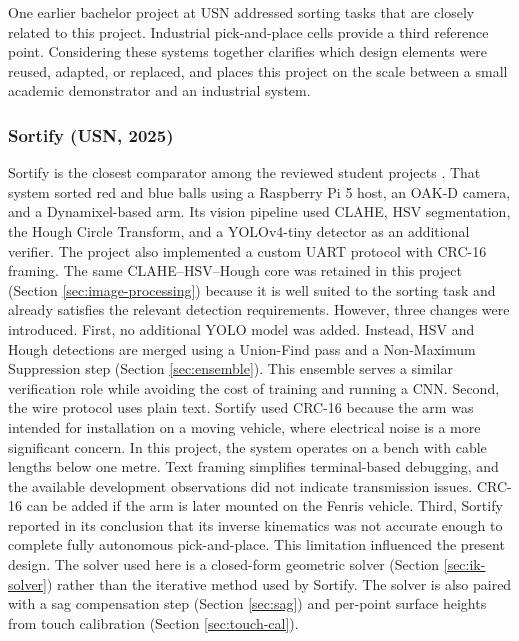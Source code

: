 \label{sec:related-systems}
One earlier bachelor project at USN addressed sorting tasks that are
closely related to this project. Industrial pick-and-place cells provide
a third reference point. Considering these systems together clarifies
which design elements were reused, adapted, or replaced, and places this
project on the scale between a small academic demonstrator and an
industrial system.

\subsubsection*{Sortify (USN, 2025)}
Sortify is the closest comparator among the reviewed student projects
\cite{sortify}. That system sorted red and blue balls using a Raspberry
Pi 5 host, an OAK-D camera, and a Dynamixel-based arm. Its vision
pipeline used CLAHE, HSV segmentation, the Hough Circle Transform, and a
YOLOv4-tiny detector as an additional verifier. The project also
implemented a custom UART protocol with CRC-16 framing.
The same CLAHE--HSV--Hough core was retained in this project
(Section \ref{sec:image-processing}) because it is well suited to the
sorting task and already satisfies the relevant detection requirements.
However, three changes were introduced.
First, no additional YOLO model was added. Instead, HSV and Hough
detections are merged using a Union-Find pass and a Non-Maximum
Suppression step (Section \ref{sec:ensemble}). This ensemble serves a
similar verification role while avoiding the cost of training and
running a CNN.
Second, the wire protocol uses plain text. Sortify used CRC-16 because
the arm was intended for installation on a moving vehicle, where
electrical noise is a more significant concern. In this project, the
system operates on a bench with cable lengths below one metre. Text
framing simplifies terminal-based debugging, and the available
development observations did not indicate transmission issues. CRC-16 can
be added if the arm is later mounted on the Fenris vehicle.
Third, Sortify reported in its conclusion that its inverse kinematics
was not accurate enough to complete fully autonomous pick-and-place. This
limitation influenced the present design. The solver used here is a
closed-form geometric solver (Section \ref{sec:ik-solver}) rather than
the iterative method used by Sortify. The solver is also paired with a
sag compensation step (Section \ref{sec:sag}) and per-point surface
heights from touch calibration (Section \ref{sec:touch-cal}).

